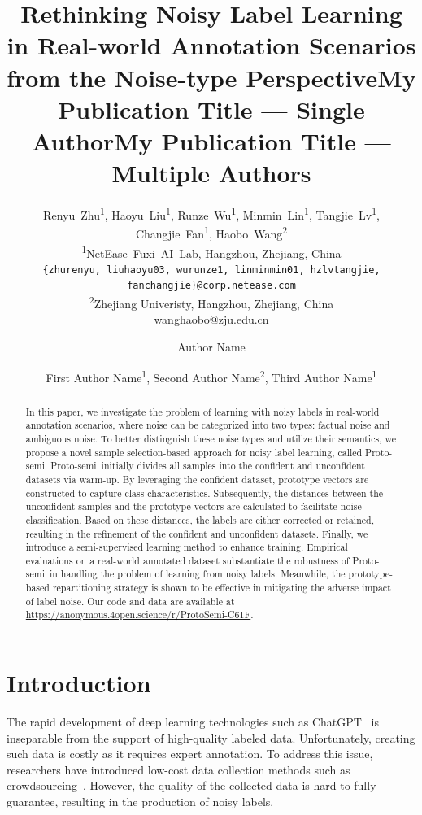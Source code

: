\documentclass[letterpaper]{article} %
\title{Rethinking Noisy Label Learning in Real-world Annotation Scenarios from the Noise-type Perspective}
\author{
  Renyu~Zhu\textsuperscript{1}, Haoyu~Liu\textsuperscript{1}, Runze~Wu\textsuperscript{1}, Minmin~Lin\textsuperscript{1},
  Tangjie~Lv\textsuperscript{1}, Changjie~Fan\textsuperscript{1}, Haobo~Wang\textsuperscript{2}\\
  \textsuperscript{1}NetEase~Fuxi~AI~Lab,
  Hangzhou, Zhejiang, China \\
  \texttt{\{zhurenyu, liuhaoyu03, wurunze1, linminmin01, hzlvtangjie, fanchangjie\}@corp.netease.com}\\
  \textsuperscript{2}Zhejiang Univeristy, Hangzhou, Zhejiang, China \\
  wanghaobo@zju.edu.cn \\
}
\title{My Publication Title --- Single Author}
\author {
    Author Name
}
\title{My Publication Title --- Multiple Authors}
\author {
    First Author Name\textsuperscript{\rm 1},
    Second Author Name\textsuperscript{\rm 2},
    Third Author Name\textsuperscript{\rm 1}
}
\newcommand{\method}{Proto-semi}
\begin{document}
\maketitle
\begin{abstract}
In this paper, we investigate the problem of learning with noisy labels in real-world annotation scenarios, where noise can be categorized into two types: factual noise and ambiguous noise. To better distinguish these noise types and utilize their semantics, we propose a novel sample selection-based approach for noisy label learning, called \method. \method\ initially divides all samples into the confident and unconfident datasets via warm-up. By leveraging the confident dataset, prototype vectors are constructed to capture class characteristics. Subsequently, the distances between the unconfident samples and the prototype vectors are calculated to facilitate noise classification. Based on these distances, the labels are either corrected or retained, resulting in the refinement of the confident and unconfident datasets. Finally, we introduce a semi-supervised learning method to enhance training. Empirical evaluations on a real-world annotated dataset substantiate the robustness of \method\ in handling the problem of learning from noisy labels. Meanwhile, the prototype-based repartitioning strategy is shown to be effective in mitigating the adverse impact of label noise. Our code and data are available at \url{https://anonymous.4open.science/r/ProtoSemi-C61F}.

\end{abstract}


\section{Introduction}

The rapid development of deep learning technologies such as ChatGPT~\cite{DBLP:conf/nips/Ouyang0JAWMZASR22} is inseparable from the support of high-quality labeled data.
Unfortunately,
creating such data is costly as it requires expert annotation.
To address this issue,
researchers have introduced low-cost data collection methods such as crowdsourcing~\cite{DBLP:journals/cacm/DoanRH11}.
However,
the quality of the collected data is hard to fully guarantee,
resulting in the production of noisy labels.
\end{document}
